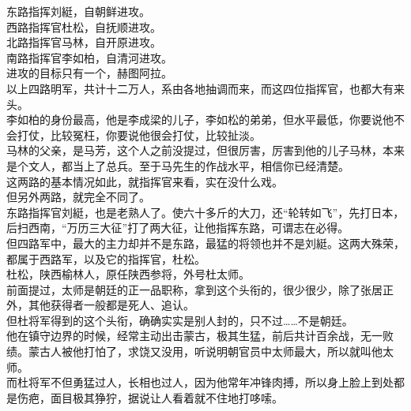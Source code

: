 \begin{multicols}{\theparacolNo}
东路指挥刘綎，自朝鲜进攻。\\

西路指挥官杜松，自抚顺进攻。\\

北路指挥官马林，自开原进攻。\\

南路指挥官李如柏，自清河进攻。\\

进攻的目标只有一个，赫图阿拉。\\

以上四路明军，共计十二万人，系由各地抽调而来，而这四位指挥官，也都大有来头。\\

李如柏的身份最高，他是李成梁的儿子，李如松的弟弟，但水平最低，你要说他不会打仗，比较冤枉，你要说他很会打仗，比较扯淡。\\

马林的父亲，是马芳，这个人之前没提过，但很厉害，厉害到他的儿子马林，本来是个文人，都当上了总兵。至于马先生的作战水平，相信你已经清楚。\\

这两路的基本情况如此，就指挥官来看，实在没什么戏。\\

但另外两路，就完全不同了。\\

东路指挥官刘綎，也是老熟人了。使六十多斤的大刀，还“轮转如飞”，先打日本，后扫西南，“万历三大征”打了两大征，让他指挥东路，可谓志在必得。\\

但四路军中，最大的主力却并不是东路，最猛的将领也并不是刘綎。这两大殊荣，都属于西路军，以及它的指挥官，杜松。\\

杜松，陕西榆林人，原任陕西参将，外号杜太师。\\

前面提过，太师是朝廷的正一品职称，拿到这个头衔的，很少很少，除了张居正外，其他获得者一般都是死人、追认。\\

但杜将军得到的这个头衔，确确实实是别人封的，只不过……不是朝廷。\\

他在镇守边界的时候，经常主动出击蒙古，极其生猛，前后共计百余战，无一败绩。蒙古人被他打怕了，求饶又没用，听说明朝官员中太师最大，所以就叫他太师。\\

而杜将军不但勇猛过人，长相也过人，因为他常年冲锋肉搏，所以身上脸上到处都是伤疤，面目极其狰狞，据说让人看着就不住地打哆嗦。\\


\end{multicols}
